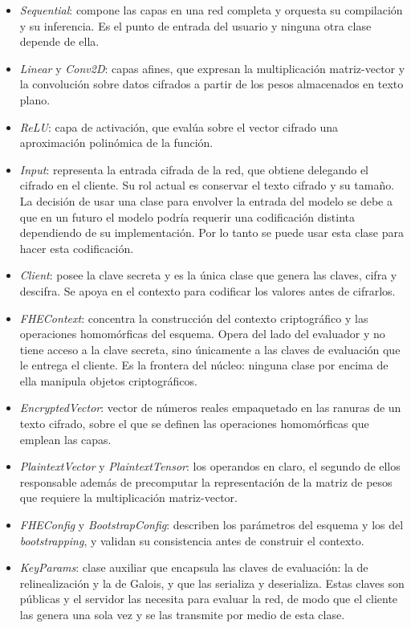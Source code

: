 \begin{itemize}
    \item \textit{Sequential}: compone las capas en una red completa y orquesta su compilación y su inferencia. Es el punto de entrada del usuario y ninguna otra clase depende de ella.
    \item \textit{Linear} y \textit{Conv2D}: capas afines, que expresan la multiplicación matriz-vector y la convolución sobre datos cifrados a partir de los pesos almacenados en texto plano.
    \item \textit{ReLU}: capa de activación, que evalúa sobre el vector cifrado una aproximación polinómica de la función.
    \item \textit{Input}: representa la entrada cifrada de la red, que obtiene delegando el cifrado en el cliente. Su rol actual es conservar el texto cifrado y su tamaño. La decisión de usar una clase para envolver la entrada del modelo se debe a que en un futuro el modelo podría requerir una codificación distinta dependiendo de su implementación. Por lo tanto se puede usar esta clase para hacer esta codificación.
    \item \textit{Client}: posee la clave secreta y es la única clase que genera las claves, cifra y descifra. Se apoya en el contexto para codificar los valores antes de cifrarlos.
    \item \textit{FHEContext}: concentra la construcción del contexto criptográfico y las operaciones homomórficas del esquema. Opera del lado del evaluador y no tiene acceso a la clave secreta, sino únicamente a las claves de evaluación que le entrega el cliente. Es la frontera del núcleo: ninguna clase por encima de ella manipula objetos criptográficos.
    \item \textit{EncryptedVector}: vector de números reales empaquetado en las ranuras de un texto cifrado, sobre el que se definen las operaciones homomórficas que emplean las capas.
    \item \textit{PlaintextVector} y \textit{PlaintextTensor}: los operandos en claro, el segundo de ellos responsable además de precomputar la representación de la matriz de pesos que requiere la multiplicación matriz-vector.
    \item \textit{FHEConfig} y \textit{BootstrapConfig}: describen los parámetros del esquema y los del \textit{bootstrapping}, y validan su consistencia antes de construir el contexto.
    \item \textit{KeyParams}: clase auxiliar que encapsula las claves de evaluación: la de relinealización y la de Galois, y que las serializa y deserializa. Estas claves son públicas y el servidor las necesita para evaluar la red, de modo que el cliente las genera una sola vez y se las transmite por medio de esta clase.
\end{itemize}

